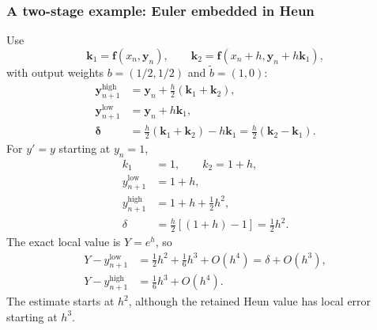 \subsubsection{A two-stage example: Euler embedded in Heun}
Use
\[
 \mathbf k_1=\mathbf f(x_n,\mathbf y_n),\qquad
 \mathbf k_2=\mathbf f(x_n+h,\mathbf y_n+h\mathbf k_1),
\]
with output weights $b=(1/2,1/2)$ and $\widetilde b=(1,0)$:
\begin{equation}\label{Eq:AdaptHeunEuler}
\begin{aligned}
 \mathbf y_{n+1}^{\mathrm{high}}
   &=\mathbf y_n+\tfrac h2(\mathbf k_1+\mathbf k_2),\\
 \mathbf y_{n+1}^{\mathrm{low}}&=\mathbf y_n+h\mathbf k_1,\\
 \boldsymbol\delta
   &=\tfrac h2(\mathbf k_1+\mathbf k_2)-h\mathbf k_1
     =\tfrac h2(\mathbf k_2-\mathbf k_1).
\end{aligned}
\end{equation}
For $y'=y$ starting at $y_n=1$,
\[
\begin{aligned}
 k_1&=1,\qquad k_2=1+h,\\
 y_{n+1}^{\mathrm{low}}&=1+h,\\
 y_{n+1}^{\mathrm{high}}&=1+h+\tfrac12h^2,\\
 \delta&=\tfrac h2[(1+h)-1]=\tfrac12h^2.
\end{aligned}
\]
The exact local value is $Y=e^h$, so
\[
\begin{aligned}
 Y-y_{n+1}^{\mathrm{low}}
 &=\tfrac12h^2+\tfrac16h^3+O(h^4)=\delta+O(h^3),\\
 Y-y_{n+1}^{\mathrm{high}}&=\tfrac16h^3+O(h^4).
\end{aligned}
\]
The estimate starts at $h^2$, although the retained Heun value has local
error starting at $h^3$.

